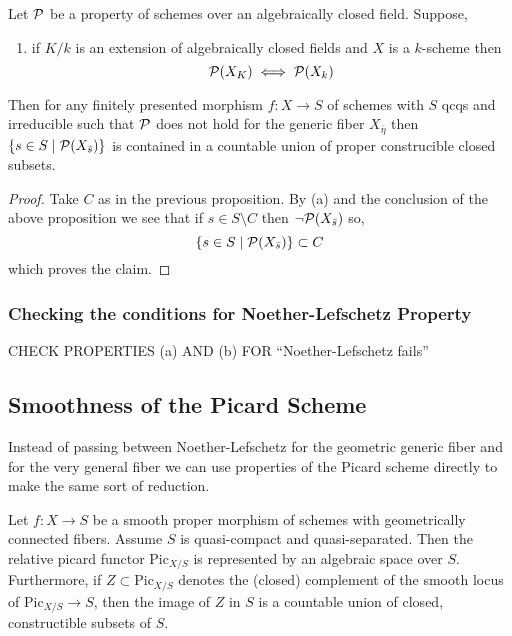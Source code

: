 \documentclass[12pt]{article}
\begin{document}
\begin{prop}
Let $\mathcal{P}$ be a property of schemes over an algebraically closed field. Suppose,
\begin{enumerate}
\item if $K/k$ is an extension of algebraically closed fields and $X$ is a $k$-scheme then
\[ \mathcal{P}(X_K) \iff \mathcal{P}(X_k) \]
\end{enumerate}
Then for any finitely presented morphism $f : X \to S$ of schemes with $S$ qcqs and irreducible such that $\mathcal{P}$ does not hold for the generic fiber $X_{\bar{\eta}}$ then $\{ s \in S \mid \mathcal{P}(X_{\bar{s}}) \}$
is contained in a countable union of proper construcible closed subsets. 
\end{prop}

\begin{proof}
Take $C$ as in the previous proposition. By (a) and the conclusion of the above proposition we see that if $s \in S \setminus C$ then $\neg \mathcal{P}(X_{\bar{s}})$ so,
\[ \{ s \in S \mid \mathcal{P}(X_{\bar{s}}) \} \subset C \]
which proves the claim. 
\end{proof}

\subsubsection{Checking the conditions for Noether-Lefschetz Property}


{\color{red} CHECK PROPERTIES (a) AND (b) FOR ``Noether-Lefschetz fails''}

\subsection{Smoothness of the Picard Scheme}

Instead of passing between Noether-Lefschetz for the geometric generic fiber and for the very general fiber we can use properties of the Picard scheme directly to make the same sort of reduction. 

\begin{lemma} \label{lemma:picard_smoothness}
    Let $f:X \to S$ be a smooth proper morphism of schemes with geometrically connected fibers. Assume $S$ is quasi-compact and quasi-separated. Then the relative picard functor $\mathrm{Pic}_{X/S}$ is represented by an algebraic space over $S$. Furthermore, if $Z \subset \mathrm{Pic}_{X/S}$ denotes the (closed) complement of the smooth locus of $\mathrm{Pic}_{X/S} \to S$, then the image of $Z$ in $S$ is a countable union of closed, constructible subsets of $S$. 
\end{lemma}
\end{document}
